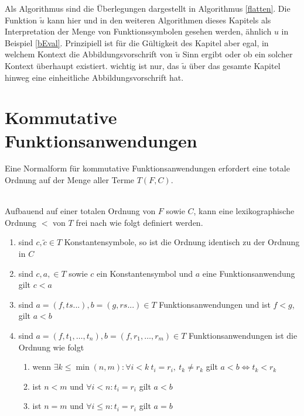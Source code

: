 Als Algorithmus sind die Überlegungen dargestellt in Algorithmus \ref{flatten}.
Die Funktion $\tilde u$ kann hier und in den weiteren Algorithmen dieses Kapitels als \grqq{} Interpretation der Menge von Funktionssymbolen gesehen werden, ähnlich $u$ in Beispiel \ref{bEval}. Prinzipiell ist für die Gültigkeit des Kapitel aber egal, in welchem Kontext die Abbildungsvorschrift von $\tilde u$ Sinn ergibt oder ob ein solcher Kontext überhaupt existiert. wichtig ist nur, das $\tilde u$ über das gesamte Kapitel hinweg eine einheitliche Abbildungsvorschrift hat.

\begin{algorithm}
\DontPrintSemicolon
\caption{$\Const{flatten} \colon T \rightarrow T$}\label{flatten}

\end{algorithm}

\section{Kommutative Funktionsanwendungen} \label{subsecNormalSortieren}
Eine Normalform für kommutative Funktionsanwendungen erfordert eine totale Ordnung auf der Menge aller Terme $T(F, C)$. 

\begin{definition}~\\ \label{defOrdnungKleiner}
Aufbauend auf einer totalen Ordnung von $F$ sowie $C$, kann eine lexikographische Ordnung $<$ von $T$ frei nach \cite{LexikografischeOrdnung} wie folgt definiert werden. 
\begin{enumerate}
	\item{sind $c, \tilde{c} \in T$ Konstantensymbole, so ist die Ordnung identisch zu der Ordnung in $C$}
	\item{sind $c, a, \in T$ sowie $c$ ein Konstantensymbol und $a$ eine Funktionsanwendung gilt $c < a$ }
	\item{sind $a = (f, ts...), b = (g, rs...) \in T$ Funktionsanwendungen und ist $f < g$, gilt $a < b$}
	\item{sind $a = (f, t_1, \dots, t_n), b = (f, r_1, \dots, r_m) \in T$ Funktionsanwendungen ist die Ordnung wie folgt}
	\begin{enumerate}
		\item{wenn $\exists k \leq \min{(n, m)} \colon \forall i < k ~ t_i = r_i ,~ t_k \neq r_k $ gilt ${a < b \iff t_k < r_k}$}
		\item{ist $n < m$ und $\forall i < n\colon t_i = r_i$ gilt $a < b$}
		\item{ist $n = m$ und $\forall i \leq n\colon t_i = r_i$ gilt $a = b$}
	\end{enumerate}
\end{enumerate}

\end{definition}

